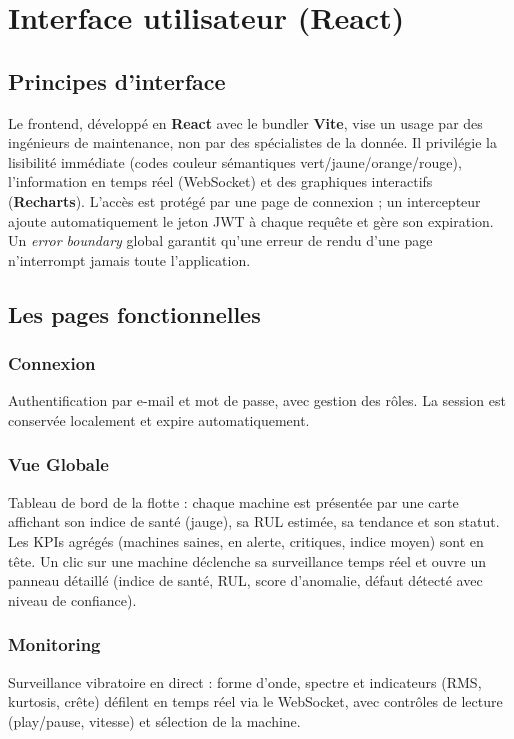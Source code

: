 \chapter{Interface utilisateur (React)}
\label{chap:frontend}

\section{Principes d'interface}
Le frontend, développé en \textbf{React} avec le bundler \textbf{Vite}, vise un usage par
des ingénieurs de maintenance, non par des spécialistes de la donnée. Il privilégie la
lisibilité immédiate (codes couleur sémantiques vert/jaune/orange/rouge), l'information en
temps réel (WebSocket) et des graphiques interactifs (\textbf{Recharts}). L'accès est
protégé par une page de connexion ; un intercepteur ajoute automatiquement le jeton JWT à
chaque requête et gère son expiration. Un \emph{error boundary} global garantit qu'une
erreur de rendu d'une page n'interrompt jamais toute l'application.

\section{Les pages fonctionnelles}
\subsection{Connexion}
Authentification par e-mail et mot de passe, avec gestion des rôles. La session est
conservée localement et expire automatiquement.

\subsection{Vue Globale}
Tableau de bord de la flotte : chaque machine est présentée par une carte affichant son
indice de santé (jauge), sa RUL estimée, sa tendance et son statut. Les KPIs agrégés
(machines saines, en alerte, critiques, indice moyen) sont en tête. Un clic sur une machine
déclenche sa surveillance temps réel et ouvre un panneau détaillé (indice de santé, RUL,
score d'anomalie, défaut détecté avec niveau de confiance).

\subsection{Monitoring}
Surveillance vibratoire en direct : forme d'onde, spectre et indicateurs (RMS, kurtosis,
crête) défilent en temps réel via le WebSocket, avec contrôles de lecture (play/pause,
vitesse) et sélection de la machine.

